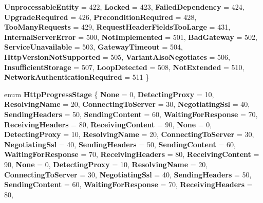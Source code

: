\begin{DoxyCompactItemize}
{\bfseries Unprocessable\+Entity} = 422, 
{\bfseries Locked} = 423, 
{\bfseries Failed\+Dependency} = 424, 
{\bfseries Upgrade\+Required} = 426, 
\newline
{\bfseries Precondition\+Required} = 428, 
{\bfseries Too\+Many\+Requests} = 429, 
{\bfseries Request\+Header\+Fields\+Too\+Large} = 431, 
{\bfseries Internal\+Server\+Error} = 500, 
\newline
{\bfseries Not\+Implemented} = 501, 
{\bfseries Bad\+Gateway} = 502, 
{\bfseries Service\+Unavailable} = 503, 
{\bfseries Gateway\+Timeout} = 504, 
\newline
{\bfseries Http\+Version\+Not\+Supported} = 505, 
{\bfseries Variant\+Also\+Negotiates} = 506, 
{\bfseries Insufficient\+Storage} = 507, 
{\bfseries Loop\+Detected} = 508, 
\newline
{\bfseries Not\+Extended} = 510, 
{\bfseries Network\+Authentication\+Required} = 511
 \}
\item 
\mbox{\label{namespace_windows_1_1_web_1_1_http_aa0f55350f3367ec69564a41407e44b3b}} 
enum {\bfseries Http\+Progress\+Stage} \{ \newline
{\bfseries None} = 0, 
{\bfseries Detecting\+Proxy} = 10, 
{\bfseries Resolving\+Name} = 20, 
{\bfseries Connecting\+To\+Server} = 30, 
\newline
{\bfseries Negotiating\+Ssl} = 40, 
{\bfseries Sending\+Headers} = 50, 
{\bfseries Sending\+Content} = 60, 
{\bfseries Waiting\+For\+Response} = 70, 
\newline
{\bfseries Receiving\+Headers} = 80, 
{\bfseries Receiving\+Content} = 90, 
{\bfseries None} = 0, 
{\bfseries Detecting\+Proxy} = 10, 
\newline
{\bfseries Resolving\+Name} = 20, 
{\bfseries Connecting\+To\+Server} = 30, 
{\bfseries Negotiating\+Ssl} = 40, 
{\bfseries Sending\+Headers} = 50, 
\newline
{\bfseries Sending\+Content} = 60, 
{\bfseries Waiting\+For\+Response} = 70, 
{\bfseries Receiving\+Headers} = 80, 
{\bfseries Receiving\+Content} = 90, 
\newline
{\bfseries None} = 0, 
{\bfseries Detecting\+Proxy} = 10, 
{\bfseries Resolving\+Name} = 20, 
{\bfseries Connecting\+To\+Server} = 30, 
\newline
{\bfseries Negotiating\+Ssl} = 40, 
{\bfseries Sending\+Headers} = 50, 
{\bfseries Sending\+Content} = 60, 
{\bfseries Waiting\+For\+Response} = 70, 
\newline
{\bfseries Receiving\+Headers} = 80, 

\end{DoxyCompactItemize}
